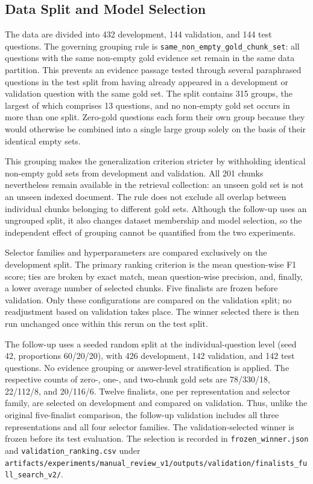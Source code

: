 \documentclass[11pt]{article}
\newcommand{\revision}[1]{#1}
\begin{document}
\subsection{Data Split and Model Selection}

The data are divided into 432 development, 144 validation, and 144 test questions. The governing grouping rule is \texttt{same\_non\_empty\_gold\_chunk\_set}: all questions with the same non-empty gold evidence set remain in the same data partition. This prevents an evidence passage tested through several paraphrased questions in the test split from having already appeared in a development or validation question with the same gold set. The split contains 315 groups, the largest of which comprises 13 questions, and no non-empty gold set occurs in more than one split. Zero-gold questions each form their own group because they would otherwise be combined into a single large group solely on the basis of their identical empty sets.

\revision{This grouping makes the generalization criterion stricter by withholding identical non-empty gold sets from development and validation. All 201 chunks nevertheless remain available in the retrieval collection: an unseen gold set is not an unseen indexed document. The rule does not exclude all overlap between individual chunks belonging to different gold sets. Although the follow-up uses an ungrouped split, it also changes dataset membership and model selection, so the independent effect of grouping cannot be quantified from the two experiments.}

Selector families and hyperparameters are compared exclusively on the development split. The primary ranking criterion is the mean question-wise F1 score; ties are broken by exact match, mean question-wise precision, and, finally, a lower average number of selected chunks. Five finalists are frozen before validation. Only these configurations are compared on the validation split; no readjustment based on validation takes place. The winner selected there is then run unchanged once within this rerun on the test split.

\revision{The follow-up uses a seeded random split at the individual-question level (seed 42, proportions 60/20/20), with 426 development, 142 validation, and 142 test questions. No evidence grouping or answer-level stratification is applied. The respective counts of zero-, one-, and two-chunk gold sets are 78/330/18, 22/112/8, and 20/116/6. Twelve finalists, one per representation and selector family, are selected on development and compared on validation. Thus, unlike the original five-finalist comparison, the follow-up validation includes all three representations and all four selector families. The validation-selected winner is frozen before its test evaluation. The selection is recorded in \nolinkurl{frozen_winner.json} and \nolinkurl{validation_ranking.csv} under \nolinkurl{artifacts/experiments/manual_review_v1/outputs/validation/finalists_full_search_v2/}.}
\end{document}
